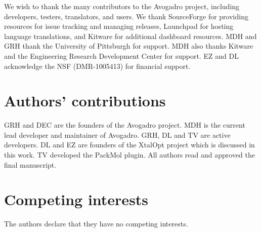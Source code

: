 \documentclass[10pt]{bmc_article}
\newenvironment{bmcformat}{\begin{raggedright}
\baselineskip20pt\sloppy\setboolean{publ}{false}}{\end{raggedright}
\baselineskip20pt\sloppy}
\begin{document}
\begin{bmcformat}
We wish to thank the many contributors to the Avogadro project, including
developers, testers, translators, and users. We thank SourceForge for
providing resources for issue tracking and managing releases,
Launchpad for hosting language translations, and
Kitware for additional dashboard resources. MDH and GRH thank the
University of Pittsburgh for support. MDH also thanks Kitware and the
Engineering Research Development Center for support. EZ and DL acknowledge
the NSF (DMR-1005413) for financial support.

\section{Authors' contributions}
GRH and DEC are the founders of the Avogadro project. MDH is the
current lead developer and maintainer of Avogadro. GRH, DL and TV are
active developers. DL and EZ are founders of the XtalOpt project which
is discussed in this work. TV developed the PackMol plugin. All
authors read and approved the final manuscript.

\section{Competing interests}

The authors declare that they have no competing interests.


\newpage
{
   }     %



\end{bmcformat}
\end{document}
